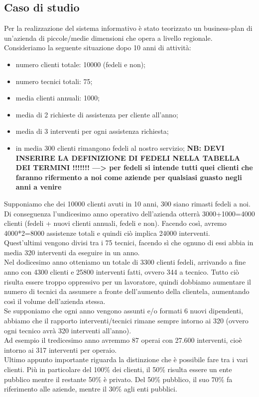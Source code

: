 \documentclass[legalpaper]{article}
\begin{document}
\subsection{Caso di studio} 
	Per la realizzazione del sistema informativo è stato teorizzato un business-plan di un'azienda di piccole/medie dimensioni che opera a livello regionale.
	Consideriamo la seguente situazione dopo 10 anni di attività:
	\begin{itemize}
		\item numero clienti totale: 10000 (fedeli e non);
		\item numero tecnici totali: 75;
		\item media clienti annuali: 1000;
		\item media di 2 richieste di assistenza per cliente all'anno;
		\item media di 3 interventi per ogni assistenza richiesta;
		\item in media 300 clienti rimangono fedeli al nostro servizio;
		\textbf{NB: DEVI INSERIRE LA DEFINIZIONE DI FEDELI NELLA TABELLA DEI TERMINI !!!!!!! ---> per fedeli si intende tutti quei clienti che faranno rifermento a noi come aziende per qualsiasi guasto negli anni a venire}
	\end{itemize}
	Supponiamo che dei 10000 clienti avuti in 10 anni, 300 siano rimasti fedeli a noi. Di conseguenza l'undicesimo anno operativo dell'azienda otterrà 3000+1000=4000 clienti (fedeli + nuovi clienti annuali, fedeli e non). Facendo così, avremo 4000*2=8000 assistenze totali  e quindi ciò implica 24000 interventi.\\
	Quest'ultimi vengono divisi tra i 75 tecnici, facendo sì che ognuno di essi abbia in media 320 interventi da eseguire in un anno.\\
	Nel dodicesimo anno otteniamo un totale di 3300 clienti fedeli, arrivando a fine anno con 4300 clienti e 25800 interventi fatti, ovvero 344 a tecnico. Tutto ciò risulta essere troppo oppressivo per un lavoratore, quindi dobbiamo aumentare il numero di tecnici da assumere a fronte dell'aumento della clientela, aumentando così il volume dell'azienda stessa.\\
	Se supponiamo che ogni anno vengono assunti e/o formati 6 nuovi dipendenti, abbiamo che il rapporto interventi/tecnici rimane sempre intorno ai 320 (ovvero ogni tecnico avrà 320 interventi all'anno).\\
	Ad esempio il tredicesimo anno avremmo 87 operai con 27.600 interventi, cioè intorno ai 317 interventi per operaio.\\
	Ultimo appunto importante riguarda la distinzione che è possibile fare tra i vari clienti.
	Più in particolare del 100\% dei clienti, il 50\% risulta essere un ente pubblico mentre il restante 50\% è privato. Del 50\% pubblico, il suo 70\% fa riferimento alle aziende, mentre il 30\% agli enti pubblici.
	
\end{document}
